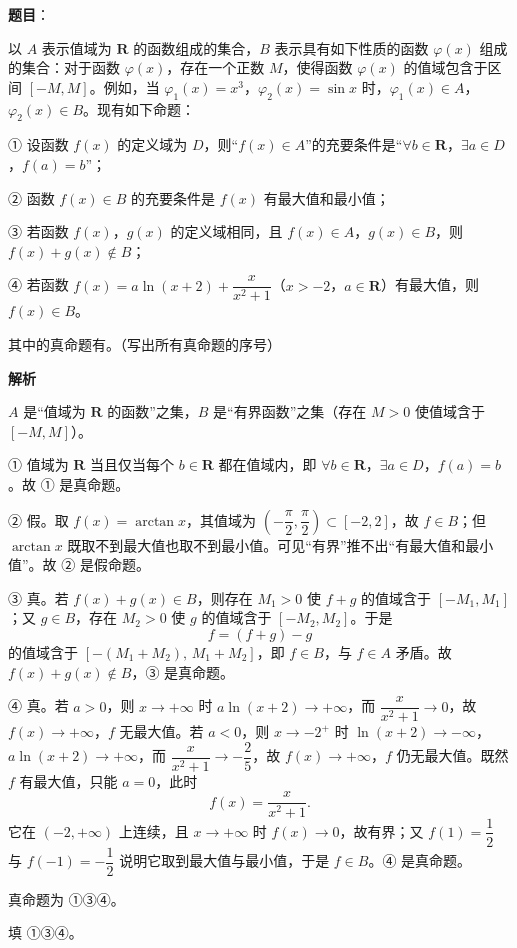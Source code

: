 \begin{answer}

\textbf{题目}：

以 $A$ 表示值域为 $\mathbf R$ 的函数组成的集合，$B$ 表示具有如下性质的函数 $\varphi(x)$ 组成的集合：对于函数 $\varphi(x)$，存在一个正数 $M$，使得函数 $\varphi(x)$ 的值域包含于区间 $[-M,M]$。例如，当 $\varphi_1(x)=x^3$，$\varphi_2(x)=\sin x$ 时，$\varphi_1(x)\in A$，$\varphi_2(x)\in B$。现有如下命题：

① 设函数 $f(x)$ 的定义域为 $D$，则“$f(x)\in A$”的充要条件是“$\forall b\in\mathbf R$，$\exists a\in D$，$f(a)=b$”；

② 函数 $f(x)\in B$ 的充要条件是 $f(x)$ 有最大值和最小值；

③ 若函数 $f(x)$，$g(x)$ 的定义域相同，且 $f(x)\in A$，$g(x)\in B$，则 $f(x)+g(x)\notin B$；

④ 若函数 $f(x)=a\ln(x+2)+\dfrac{x}{x^2+1}$（$x>-2$，$a\in\mathbf R$）有最大值，则 $f(x)\in B$。

其中的真命题有\gkblank{}。（写出所有真命题的序号）

\textbf{解析}

$A$ 是“值域为 $\mathbf R$ 的函数”之集，$B$ 是“有界函数”之集（存在 $M>0$ 使值域含于 $[-M,M]$）。

① 值域为 $\mathbf R$ 当且仅当每个 $b\in\mathbf R$ 都在值域内，即 $\forall b\in\mathbf R$，$\exists a\in D$，$f(a)=b$。故 ① 是真命题。

② 假。取 $f(x)=\arctan x$，其值域为 $\left(-\dfrac\pi2,\dfrac\pi2\right)\subset[-2,2]$，故 $f\in B$；但 $\arctan x$ 既取不到最大值也取不到最小值。可见“有界”推不出“有最大值和最小值”。故 ② 是假命题。

③ 真。若 $f(x)+g(x)\in B$，则存在 $M_1>0$ 使 $f+g$ 的值域含于 $[-M_1,M_1]$；又 $g\in B$，存在 $M_2>0$ 使 $g$ 的值域含于 $[-M_2,M_2]$。于是
\nopagebreak[4]
\[f=(f+g)-g\]
的值域含于 $[-(M_1+M_2),\,M_1+M_2]$，即 $f\in B$，与 $f\in A$ 矛盾。故 $f(x)+g(x)\notin B$，③ 是真命题。

④ 真。若 $a>0$，则 $x\to+\infty$ 时 $a\ln(x+2)\to+\infty$，而 $\dfrac{x}{x^2+1}\to 0$，故 $f(x)\to+\infty$，$f$ 无最大值。若 $a<0$，则 $x\to-2^+$ 时 $\ln(x+2)\to-\infty$，$a\ln(x+2)\to+\infty$，而 $\dfrac{x}{x^2+1}\to-\dfrac25$，故 $f(x)\to+\infty$，$f$ 仍无最大值。既然 $f$ 有最大值，只能 $a=0$，此时
\nopagebreak[4]
\[f(x)=\frac{x}{x^2+1}.\]
它在 $(-2,+\infty)$ 上连续，且 $x\to+\infty$ 时 $f(x)\to 0$，故有界；又 $f(1)=\dfrac12$ 与 $f(-1)=-\dfrac12$ 说明它取到最大值与最小值，于是 $f\in B$。④ 是真命题。

真命题为 ①③④。

填 ①③④。


\end{answer}
